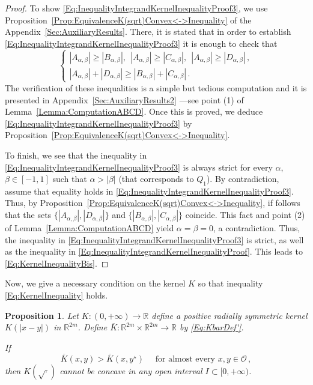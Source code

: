 \documentclass[12pt,reqno]{amsart}
\newtheorem{proposition}[theorem]{Proposition}
\theoremstyle{definition}
\theoremstyle{remark}
\newcommand{\con}[1]{\mathbb{#1}}
\newcommand{\R}{\con{R}} %
\numberwithin{equation}{section}
\begin{document}
\begin{proof}
	To show \eqref{Eq:InequalityIntegrandKernelInequalityProof3}, we use Proposition~\ref{Prop:EquivalenceK(sqrt)Convex<->Inequality} of the Appendix~\ref{Sec:AuxiliaryResults}. There, it is stated that in order to establish \eqref{Eq:InequalityIntegrandKernelInequalityProof3} it is enough to check that
	$$
	\begin{cases}
	|A_{\alpha,\beta}| \geq |B_{\alpha,\beta}|,\ \ |A_{\alpha,\beta}| \geq |C_{\alpha,\beta}|, \ \ |A_{\alpha,\beta}| \geq |D_{\alpha,\beta}|\,, \\
	|A_{\alpha,\beta}| + |D_{\alpha,\beta}| \geq |B_{\alpha,\beta}| + |C_{\alpha,\beta}|\,.
	\end{cases}
	$$
	The verification of these inequalities is a simple but tedious computation and it is presented in Appendix~\ref{Sec:AuxiliaryResults2} ---see point (1) of Lemma~\ref{Lemma:ComputationABCD}. Once this is proved, we deduce \eqref{Eq:InequalityIntegrandKernelInequalityProof3} by Proposition~\ref{Prop:EquivalenceK(sqrt)Convex<->Inequality}.
	
	To finish, we see that the inequality in \eqref{Eq:InequalityIntegrandKernelInequalityProof3} is always strict for every $\alpha$, $\beta \in [-1,1]$ such that $\alpha > |\beta|$ (that corresponds to $Q_1$). By contradiction, assume that equality holds in \eqref{Eq:InequalityIntegrandKernelInequalityProof3}. Thus, by Proposition~\ref{Prop:EquivalenceK(sqrt)Convex<->Inequality}, if follows that the sets $\{|A_{\alpha,\beta}|, |D_{\alpha,\beta}|\} $ and $\{|B_{\alpha,\beta}|,|C_{\alpha,\beta}|\}$ coincide. This fact and point (2) of Lemma~\ref{Lemma:ComputationABCD} yield $\alpha = \beta = 0$, a contradiction. Thus, the inequality in \eqref{Eq:InequalityIntegrandKernelInequalityProof3} is strict, as well as the inequality in \eqref{Eq:InequalityIntegrandKernelInequalityProof}. This leads to \eqref{Eq:KernelInequalityBis}.
\end{proof}


Now, we give a necessary condition on the kernel $K$ so that inequality \eqref{Eq:KernelInequality} holds.

\begin{proposition}
	\label{Prop:KernelInequalityNecessaryCondition} Let $K:(0,+\infty) \to \R$ define a positive radially symmetric kernel $K(|x-y|)$ in $\R^{2m}$. Define $\overline{K} : \R^{2m}\times \R^{2m} \to \R$ by \eqref{Eq:KbarDef'}. 
	
	If
	\begin{equation}
	\label{Eq:KernelInequalityAE}
	\overline{K}(x,y) > \overline{K}(x, y^\star) \quad \text{ for almost every }x,y \in \mathcal{O}\,,
	\end{equation}
	then $K(\sqrt{\cdot})$ cannot be concave in any open interval $I\subset [0,+\infty)$.
\end{proposition}
\end{document}
